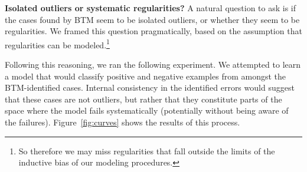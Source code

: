 
\textbf{Isolated outliers or systematic regularities?}  A natural question to ask is if the cases found by BTM seem to be isolated outliers, or whether they seem to be regularities.  We framed this question pragmatically, based on the assumption that regularities can be modeled.\footnote{So therefore we may miss regularities that fall outside the limits of the inductive bias of our modeling procedures.} 

Following this reasoning, we ran the following experiment.  We attempted to learn a model that would classify positive and negative examples from amongst the BTM-identified cases.  Internal consistency in the identified errors would suggest that these cases are not outliers, but rather that they constitute parts of the space where the model fails systematically (potentially without being aware of the failures).
Figure~\ref{fig:curves} shows the results of this process. 

